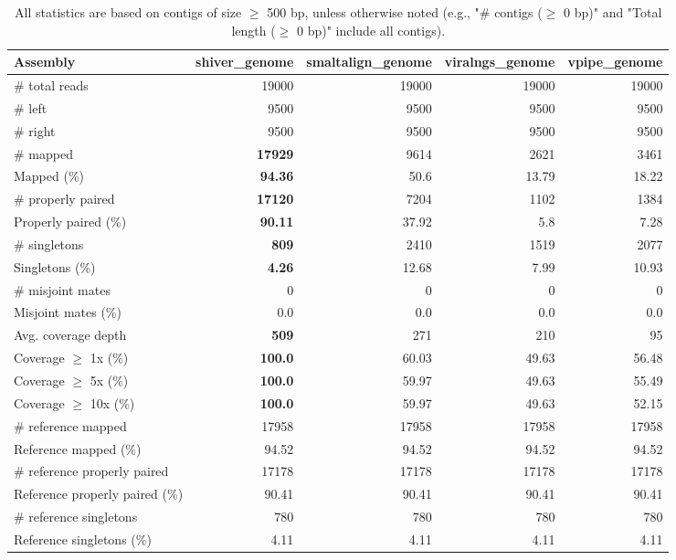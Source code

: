 \documentclass[12pt,a4paper]{article}
\begin{document}
\begin{table}[ht]
\begin{center}
\caption{All statistics are based on contigs of size $\geq$ 500 bp, unless otherwise noted (e.g., "\# contigs ($\geq$ 0 bp)" and "Total length ($\geq$ 0 bp)" include all contigs).}
\begin{tabular}{|l*{4}{|r}|}
\hline
Assembly & shiver\_genome & smaltalign\_genome & viralngs\_genome & vpipe\_genome \\ \hline
\# total reads & 19000 & 19000 & 19000 & 19000 \\ \hline
\# left & 9500 & 9500 & 9500 & 9500 \\ \hline
\# right & 9500 & 9500 & 9500 & 9500 \\ \hline
\# mapped & {\bf 17929} & 9614 & 2621 & 3461 \\ \hline
Mapped (\%) & {\bf 94.36} & 50.6 & 13.79 & 18.22 \\ \hline
\# properly paired & {\bf 17120} & 7204 & 1102 & 1384 \\ \hline
Properly paired (\%) & {\bf 90.11} & 37.92 & 5.8 & 7.28 \\ \hline
\# singletons & {\bf 809} & 2410 & 1519 & 2077 \\ \hline
Singletons (\%) & {\bf 4.26} & 12.68 & 7.99 & 10.93 \\ \hline
\# misjoint mates & 0 & 0 & 0 & 0 \\ \hline
Misjoint mates (\%) & 0.0 & 0.0 & 0.0 & 0.0 \\ \hline
Avg. coverage depth & {\bf 509} & 271 & 210 & 95 \\ \hline
Coverage $\geq$ 1x (\%) & {\bf 100.0} & 60.03 & 49.63 & 56.48 \\ \hline
Coverage $\geq$ 5x (\%) & {\bf 100.0} & 59.97 & 49.63 & 55.49 \\ \hline
Coverage $\geq$ 10x (\%) & {\bf 100.0} & 59.97 & 49.63 & 52.15 \\ \hline
\# reference mapped & 17958 & 17958 & 17958 & 17958 \\ \hline
Reference mapped (\%) & 94.52 & 94.52 & 94.52 & 94.52 \\ \hline
\# reference properly paired & 17178 & 17178 & 17178 & 17178 \\ \hline
Reference properly paired (\%) & 90.41 & 90.41 & 90.41 & 90.41 \\ \hline
\# reference singletons & 780 & 780 & 780 & 780 \\ \hline
Reference singletons (\%) & 4.11 & 4.11 & 4.11 & 4.11 \\ \hline

\end{tabular}
\end{center}
\end{table}
\end{document}
